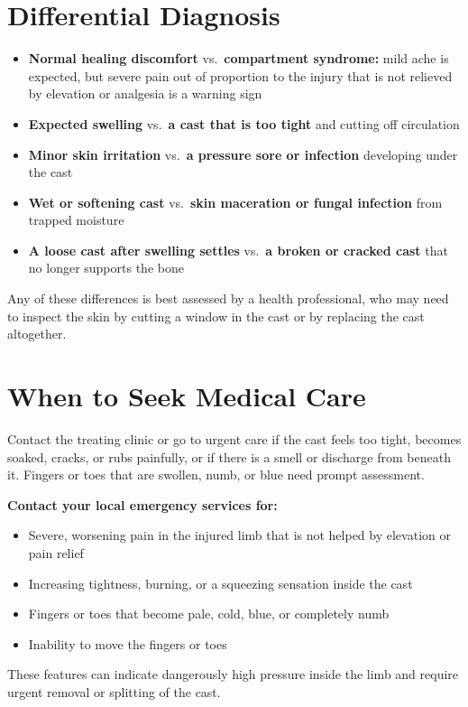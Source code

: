\section*{Differential Diagnosis}
\begin{itemize}
    \item \textbf{Normal healing discomfort} vs.\ \textbf{compartment syndrome:} mild ache is expected, but severe pain out of proportion to the injury that is not relieved by elevation or analgesia is a warning sign
    \item \textbf{Expected swelling} vs.\ \textbf{a cast that is too tight} and cutting off circulation
    \item \textbf{Minor skin irritation} vs.\ \textbf{a pressure sore or infection} developing under the cast
    \item \textbf{Wet or softening cast} vs.\ \textbf{skin maceration or fungal infection} from trapped moisture
    \item \textbf{A loose cast after swelling settles} vs.\ \textbf{a broken or cracked cast} that no longer supports the bone
\end{itemize}

Any of these differences is best assessed by a health professional, who may need to inspect the skin by cutting a window in the cast or by replacing the cast altogether.

\section*{When to Seek Medical Care}
Contact the treating clinic or go to urgent care if the cast feels too tight, becomes soaked, cracks, or rubs painfully, or if there is a smell or discharge from beneath it. Fingers or toes that are swollen, numb, or blue need prompt assessment.

\textbf{Contact your local emergency services for:}
\begin{itemize}
    \item Severe, worsening pain in the injured limb that is not helped by elevation or pain relief
    \item Increasing tightness, burning, or a squeezing sensation inside the cast
    \item Fingers or toes that become pale, cold, blue, or completely numb
    \item Inability to move the fingers or toes
\end{itemize}

These features can indicate dangerously high pressure inside the limb and require urgent removal or splitting of the cast.

